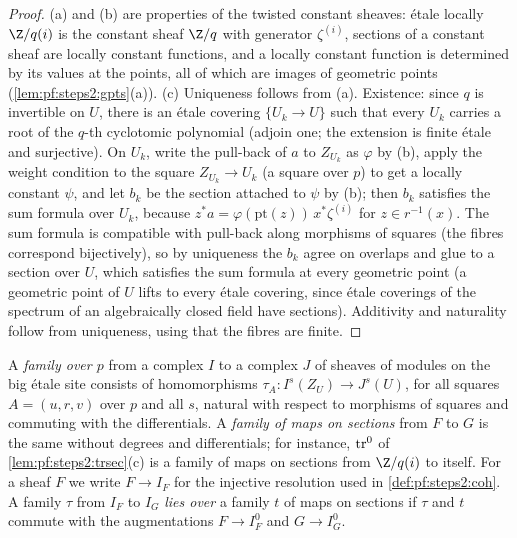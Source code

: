 \begin{proof}
(a) and (b) are properties of the twisted constant sheaves: \'etale locally $\Z/q(i)$ is the constant
sheaf $\Z/q$ with generator $\zeta^{(i)}$, sections of a constant sheaf are locally constant functions,
and a locally constant function is determined by its values at the points, all of which are images of
geometric points (\cref{lem:pf:steps2:gpts}(a)). (c) Uniqueness follows from (a). Existence: since $q$
is invertible on $U$, there is an \'etale covering $\{U_k\to U\}$ such that every $U_k$ carries a root
of the $q$-th cyclotomic polynomial (adjoin one; the extension is finite \'etale and surjective). On
$U_k$, write the pull-back of $a$ to $Z_{U_k}$ as $\varphi$ by (b), apply the weight condition to the
square $Z_{U_k}\to U_k$ (a square over $p$) to get a locally constant $\psi$, and let $b_k$ be the
section attached to $\psi$ by (b); then $b_k$ satisfies the sum formula over $U_k$, because
$z^\ast a=\varphi(\mathrm{pt}(z))\,x^\ast\zeta^{(i)}$ for $z\in r^{-1}(x)$. The sum formula is
compatible with pull-back along morphisms of squares (the fibres correspond bijectively), so by
uniqueness the $b_k$ agree on overlaps and glue to a section over $U$, which satisfies the sum formula
at every geometric point (a geometric point of $U$ lifts to every \'etale covering, since \'etale
coverings of the spectrum of an algebraically closed field have sections). Additivity and naturality
follow from uniqueness, using that the fibres are finite.
\end{proof}

A \emph{family over $p$} from a complex $I$ to a complex $J$ of sheaves of modules on the big \'etale
site consists of homomorphisms $\tau_A\colon I^s(Z_U)\to J^s(U)$, for all squares $A=(u,r,v)$ over $p$
and all $s$, natural with respect to morphisms of squares and commuting with the differentials. A
\emph{family of maps on sections} from $F$ to $G$ is the same without degrees and differentials; for
instance, $\mathrm{tr}^0$ of \cref{lem:pf:steps2:trsec}(c) is a family of maps on sections from $\Z/q(i)$
to itself. For a sheaf $F$ we write $F\to I_F$ for the injective resolution used in
\cref{def:pf:steps2:coh}. A family $\tau$ from $I_F$ to $I_G$ \emph{lies over} a family $t$ of maps on
sections if $\tau$ and $t$ commute with the augmentations $F\to I_F^0$ and $G\to I_G^0$.

